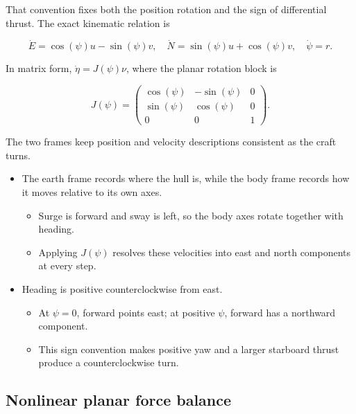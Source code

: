 \documentclass[10pt,letterpaper]{article}
\begin{document}
That convention fixes both the position rotation and the sign of differential thrust. The exact kinematic relation is

\begin{equation}
\dot{E} = \cos(\psi)u - \sin(\psi)v,\quad\dot{N} = \sin(\psi)u + \cos(\psi)v,\quad\dot{\psi} = r.
\end{equation}

In matrix form, \(\dot{\eta} = J(\psi)\nu\), where the planar rotation block is

\begin{equation}
J(\psi) = \begin{pmatrix}
\cos(\psi) & - \sin(\psi) & 0 \\
\sin(\psi) & \cos(\psi) & 0 \\
0 & 0 & 1
\end{pmatrix}.
\end{equation}

The two frames keep position and velocity descriptions consistent as the craft turns.

\begin{itemize}
\item
  The earth frame records where the hull is, while the body frame records how it moves relative to its own axes.

  \begin{itemize}
  \item
    Surge is forward and sway is left, so the body axes rotate together with heading.
  \item
    Applying \(J(\psi)\) resolves these velocities into east and north components at every step.
  \end{itemize}
\item
  Heading is positive counterclockwise from east.

  \begin{itemize}
  \item
    At \(\psi = 0\), forward points east; at positive \(\psi\), forward has a northward component.
  \item
    This sign convention makes positive yaw and a larger starboard thrust produce a counterclockwise turn.
  \end{itemize}
\end{itemize}

\subsection{Nonlinear planar force balance}
\end{document}
